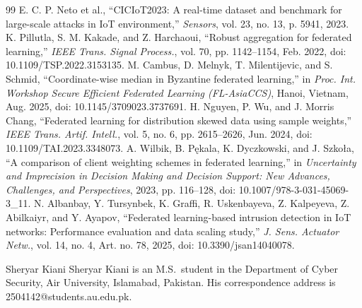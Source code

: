 \documentclass{ieeeaccess}
\newcounter{biography}
\begin{document}
\begin{thebibliography}{99}
 E. C. P. Neto et al., ``CICIoT2023: A real-time dataset and benchmark for large-scale attacks in IoT environment,'' \emph{Sensors}, vol. 23, no. 13, p. 5941, 2023.
 K. Pillutla, S. M. Kakade, and Z. Harchaoui, ``Robust aggregation for federated learning,'' \emph{IEEE Trans. Signal Process.}, vol. 70, pp. 1142--1154, Feb. 2022, doi: 10.1109/TSP.2022.3153135.
 M. Cambus, D. Melnyk, T. Milentijevic, and S. Schmid, ``Coordinate-wise median in Byzantine federated learning,'' in \emph{Proc. Int. Workshop Secure Efficient Federated Learning (FL-AsiaCCS)}, Hanoi, Vietnam, Aug. 2025, doi: 10.1145/3709023.3737691.
 H. Nguyen, P. Wu, and J. Morris Chang, ``Federated learning for distribution skewed data using sample weights,'' \emph{IEEE Trans. Artif. Intell.}, vol. 5, no. 6, pp. 2615--2626, Jun. 2024, doi: 10.1109/TAI.2023.3348073.
 A. Wilbik, B. P\k{e}kala, K. Dyczkowski, and J. Szko{\l}a, ``A comparison of client weighting schemes in federated learning,'' in \emph{Uncertainty and Imprecision in Decision Making and Decision Support: New Advances, Challenges, and Perspectives}, 2023, pp. 116--128, doi: 10.1007/978-3-031-45069-3\_11.
 N. Albanbay, Y. Tursynbek, K. Graffi, R. Uskenbayeva, Z. Kalpeyeva, Z. Abilkaiyr, and Y. Ayapov, ``Federated learning-based intrusion detection in IoT networks: Performance evaluation and data scaling study,'' \emph{J. Sens. Actuator Netw.}, vol. 14, no. 4, Art. no. 78, 2025, doi: 10.3390/jsan14040078.
\end{thebibliography}

\begin{IEEEbiographynophoto}{Sheryar Kiani}
Sheryar Kiani is an M.S.\ student in the Department of Cyber Security, Air University, Islamabad, Pakistan. His correspondence address is 2504142@students.au.edu.pk.
\end{IEEEbiographynophoto}

\EOD
\end{document}
